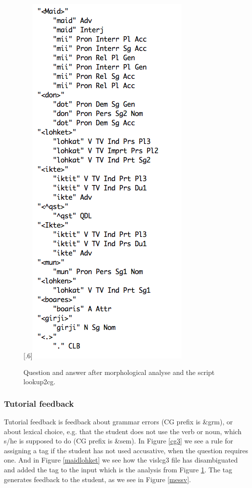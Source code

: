 \documentclass[a4paper,12pt]{article}
\begin{document}
\begin{figure}[htbp]
\begin{center}
\scalebox{.6}[.6]{\includegraphics{img/iktelohken.png}}
\caption{Question and answer after morphological analyse and the script lookup2cg.}
\label{iktelohken}
\end{center}
\end{figure}

\newpage
\subsubsection{Tutorial feedback}
Tutorial feedback is feedback about grammar errors (CG prefix is \&grm), or about lexical choice, e.g. that the student does not use the verb or noun, which s/he is supposed to do (CG prefix is \&sem). In Figure \ref{cg3} we see a rule for assigning a tag if the student has not used accusative, when the question requires one. And in Figure \ref{maidlohket} we see how the vislcg3 file has disambiguated and added the tag to the input which is the analysis from Figure \ref{iktelohken}. The tag generates feedback to the student, as we see in Figure \ref{messv}.
\end{document}
